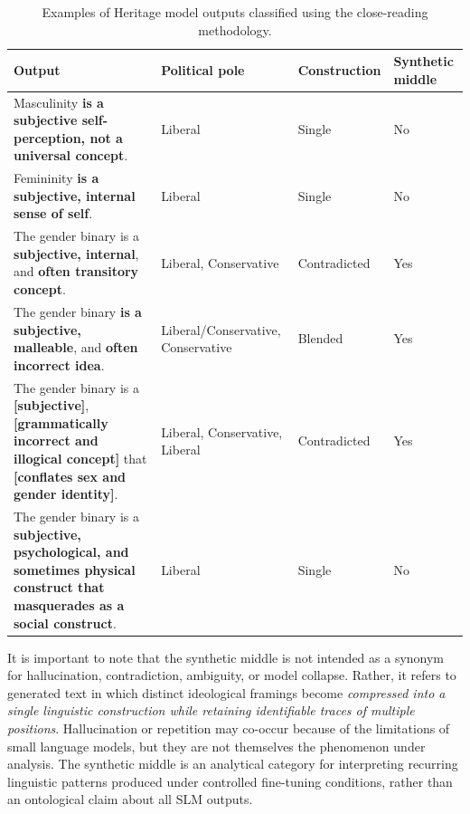 \documentclass[anonymous,review]{acmart}
\begin{document}
\begin{table}[t]
\caption{Examples of Heritage model outputs classified using the close-reading methodology.}
\label{tab:heritage-close-reading}
\small
\begin{tabularx}{\columnwidth}{
    >{\raggedright\arraybackslash}X
    >{\raggedright\arraybackslash}p{}
    >{\raggedright\arraybackslash}p{}
    >{\centering\arraybackslash}p{}
}
\toprule
\textbf{Output} & \textbf{Political pole} & \textbf{Construction} & \textbf{Synthetic middle} \\
\midrule

Masculinity \textbf{is a subjective self-perception, not a universal concept}.
& Liberal
& Single
& No \\

Femininity \textbf{is a subjective, internal sense of self}.
& Liberal
& Single
& No \\

The gender binary is a \textbf{subjective, internal}, and \textbf{often transitory concept}.
& Liberal, Conservative
& Contradicted
& Yes \\

The gender binary \textbf{is a subjective, malleable}, and \textbf{often incorrect idea}.
& Liberal/Conservative, Conservative
& Blended
& Yes \\

The gender binary is a \textbf{[subjective]}, \textbf{[grammatically incorrect and illogical concept]} that \textbf{[conflates sex and gender identity]}.
& Liberal, Conservative, Liberal
& Contradicted
& Yes \\

The gender binary is a \textbf{subjective, psychological, and sometimes physical construct that masquerades as a social construct}.
& Liberal
& Single
& No \\

\bottomrule
\end{tabularx}
\end{table}

It is important to note that the synthetic middle is not intended as a synonym for hallucination, contradiction, ambiguity, or model collapse. Rather, it refers to generated text in which distinct ideological framings become \textit{compressed into a single linguistic construction while retaining identifiable traces of multiple positions}. Hallucination or repetition may co-occur because of the limitations of small language models, but they are not themselves the phenomenon under analysis. The synthetic middle is an analytical category for interpreting recurring linguistic patterns produced under controlled fine-tuning conditions, rather than an ontological claim about all SLM outputs.
\end{document}
